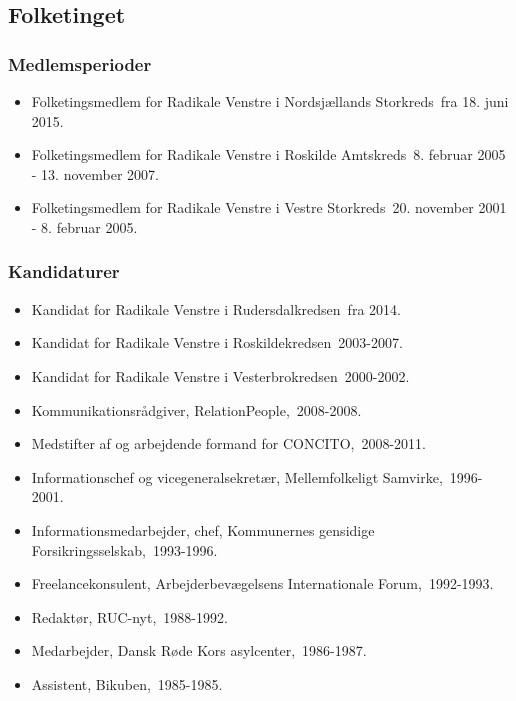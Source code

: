 \documentclass[11pt, a4paper]{awesome-cv}
\begin{document}
\begin{cvletter}
\subsection*{Folketinget}
\subsubsection*{Medlemsperioder}
\begin{itemize}
\item Folketingsmedlem for Radikale Venstre i Nordsjællands Storkreds fra 18. juni 2015.
\item Folketingsmedlem for Radikale Venstre i Roskilde Amtskreds 8. februar 2005 - 13. november 2007.
\item Folketingsmedlem for Radikale Venstre i Vestre Storkreds 20. november 2001 - 8. februar 2005.
\end{itemize}
\subsubsection*{Kandidaturer}
\begin{itemize}
\item Kandidat for Radikale Venstre i Rudersdalkredsen fra 2014.
\item Kandidat for Radikale Venstre i Roskildekredsen 2003-2007.
\item Kandidat for Radikale Venstre i Vesterbrokredsen 2000-2002.
\end{itemize}
\begin{itemize}
\item Kommunikationsrådgiver, RelationPeople, 2008-2008.
\item Medstifter af og arbejdende formand for CONCITO, 2008-2011.
\item Informationschef og vicegeneralsekretær, Mellemfolkeligt Samvirke, 1996-2001.
\item Informationsmedarbejder, chef, Kommunernes gensidige Forsikringsselskab, 1993-1996.
\item Freelancekonsulent, Arbejderbevægelsens Internationale Forum, 1992-1993.
\item Redaktør, RUC-nyt, 1988-1992.
\item Medarbejder, Dansk Røde Kors asylcenter, 1986-1987.
\item Assistent, Bikuben, 1985-1985.
\end{itemize}
\end{cvletter}
\end{document}
